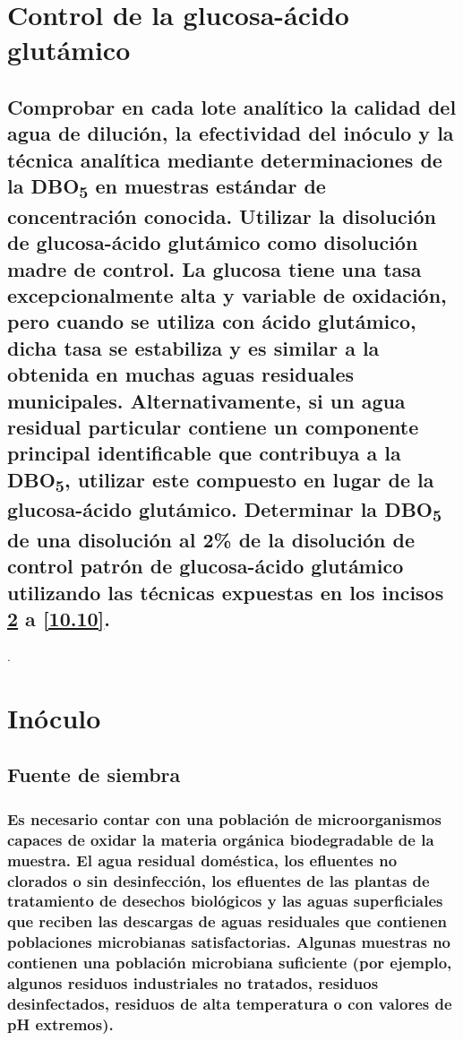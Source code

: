 \documentclass[spanish,12pt,letterpaper,titlepage]{article}
\theoremstyle{definition}
\begin{document}
	\section{Control de la glucosa-ácido glutámico}\label{10.3}
	\subsection{Comprobar en cada lote analítico la calidad del agua de dilución, la efectividad del inóculo y la técnica analítica mediante determinaciones de la DBO\textsubscript{5} en muestras estándar de concentración conocida. Utilizar la disolución de glucosa-ácido glutámico como disolución madre de control. La glucosa tiene una tasa excepcionalmente alta y variable de oxidación, pero cuando se utiliza con ácido glutámico, dicha tasa se estabiliza y es similar a la obtenida en muchas aguas residuales municipales. Alternativamente, si un agua residual particular contiene un componente principal identificable que contribuya a la DBO\textsubscript{5}, utilizar este compuesto en lugar de la glucosa-ácido glutámico. Determinar la DBO\textsubscript{5} de una disolución al 2\% de la disolución de control patrón de glucosa-ácido glutámico utilizando las técnicas expuestas en los incisos \ref{10.4} a \ref{10.10}.}\label{10.3.1}.
	\section{Inóculo}\label{10.4}
	\subsection{Fuente de siembra}\label{10.4.1}
	\subsubsection{Es necesario contar con una población de microorganismos capaces de oxidar la materia orgánica biodegradable de la muestra. El agua residual doméstica, los efluentes no clorados o sin desinfección, los efluentes de las plantas de tratamiento de desechos biológicos y las aguas superficiales que reciben las descargas de aguas residuales que contienen poblaciones microbianas satisfactorias. Algunas muestras no contienen una población microbiana suficiente (por ejemplo, algunos residuos industriales no tratados, residuos desinfectados, residuos de alta temperatura o con valores de pH extremos).}\label{10.4.1.1}
\end{document}
